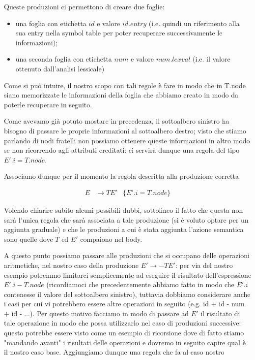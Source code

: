 \documentclass[class=book, crop=false, oneside, 12pt]{standalone}
\begin{document}
Queste produzioni ci permettono di creare due foglie:

\begin{itemize}
    \item una foglia con etichetta \(id\) e valore \(id.entry\) (i.e. quindi un riferimento alla sua entry nella symbol table per poter recuperare successivamente le informazioni);
    \item una seconda foglia con etichetta \(num\) e valore \(num.lexval\) (i.e. il valore ottenuto dall'analisi lessicale)
\end{itemize}

Come si può intuire, il nostro scopo con tali regole è fare in modo che in T.node siano memorizzate le informazioni della foglia che abbiamo creato in modo da poterle recuperare in seguito.

Come avevamo già potuto mostare in precedenza, il sottoalbero sinistro ha bisogno di passare le proprie informazioni al sottoalbero destro; visto che stiamo parlando di nodi fratelli non possiamo ottenere queste informazioni in altro modo se non ricorrendo agli attributi ereditati: ci servirà dunque una regola del tipo \(E'.i = T.node\).

Associamo dunque per il momento la regola descritta alla produzione corretta 

\begin{align*}
    E &\to TE' &\{E'.i = T.node\}
\end{align*}

Volendo chiarire subito alcuni possibili dubbi, sottolineo il fatto che questa non sarà l'unica regola che sarà associata a tale produzione (si è voluto optare per un aggiunta graduale) e che le produzioni a cui è stata aggiunta l'azione semantica sono quelle dove \(T\) ed \(E'\) compaiono nel body.

A questo punto possiamo passare alle produzioni che si occupano delle operazioni aritmetiche, nel nostro caso della produzione \(E' \to -TE'\): per via del nostro esempio potremmo limitarci semplicemente ad eseguire il risultato dell'espressione \(E'.i - T.node\) (ricordiamoci che precedentemente abbiamo fatto in modo che \(E'.i\) contenesse il valore del sottoalbero sinistro), tuttavia dobbiamo considerare anche i casi per cui vi potrebbero essere altre operazioni in seguito (e.g. id + id - num + id - ...). Per questo motivo facciamo in modo di passare ad \(E'\) il risultato di tale operazione in modo che possa utilizzarlo nel caso di produzioni successive: questo potrebbe essere visto come un esempio di ricorsione dove di fatto stiamo "mandando avanti" i risultati delle operazioni e dovremo in seguito capire qual è il nostro caso base. Aggiungiamo dunque una regola che fa al caso nostro 
\end{document}
